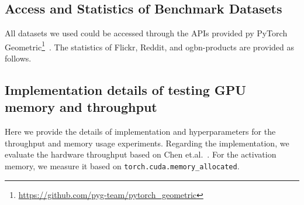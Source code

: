\message{ !name(main.tex)}\documentclass{article}
\begin{document}
\subsection{Access and Statistics of Benchmark Datasets}\label{app:datasets}
All datasets we used could be accessed through the APIs provided py PyTorch Geometric\footnote{\url{https://github.com/pyg-team/pytorch_geometric}}~\cite{fey2019fast}. The statistics of Flickr, Reddit, and ogbn-products are provided as follows.
\begin{table}[!ht]
	\centering
	\caption{The statistics of Flickr, Reddit, and ogbn-products}
	\label{tab:my_label}
\end{table}

\vspace{-3mm}
\subsection{Implementation details of testing GPU memory and throughput}\label{app:implementation_details_speed_and_mem}

Here we provide the details of implementation and hyperparameters for the throughput and memory usage experiments.
Regarding the implementation,
we evaluate the hardware throughput based on Chen et.al.~\citep{chen2021actnn}.
For the activation memory, we measure it based on \texttt{torch.cuda.memory\_allocated}.
\end{document}
